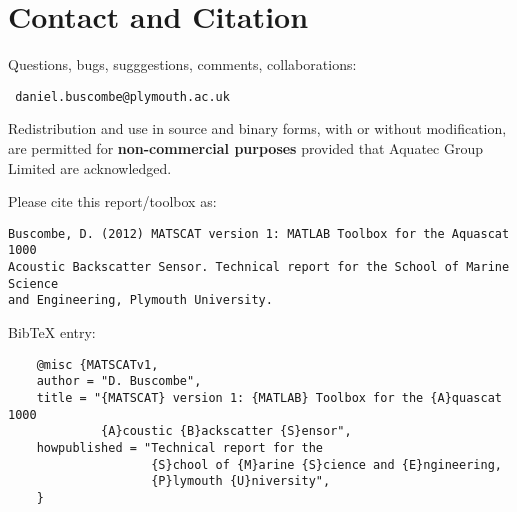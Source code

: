 \documentclass[a4paper,10pt]{report}
\begin{document}
\section{Contact and Citation}
Questions, bugs, sugggestions, comments, collaborations: \begin{verbatim} daniel.buscombe@plymouth.ac.uk \end{verbatim}

Redistribution and use in source and binary forms, with or without modification, are permitted for \textbf{non-commercial purposes} provided that Aquatec Group Limited are acknowledged. 

Please cite this report/toolbox as:
\begin{verbatim}
Buscombe, D. (2012) MATSCAT version 1: MATLAB Toolbox for the Aquascat 1000 
Acoustic Backscatter Sensor. Technical report for the School of Marine Science 
and Engineering, Plymouth University.
\end{verbatim}

BibTeX entry:
\begin{verbatim}
    @misc {MATSCATv1,
    author = "D. Buscombe",
    title = "{MATSCAT} version 1: {MATLAB} Toolbox for the {A}quascat 1000 
             {A}coustic {B}ackscatter {S}ensor",
    howpublished = "Technical report for the 
                    {S}chool of {M}arine {S}cience and {E}ngineering, 
                    {P}lymouth {U}niversity",
    }
\end{verbatim}
\end{document}
